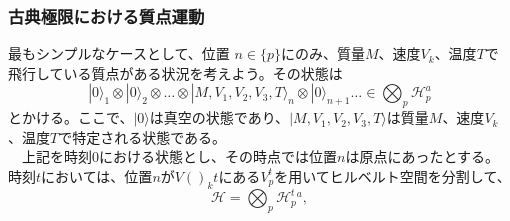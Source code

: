 \subsubsection{古典極限における質点運動}
最もシンプルなケースとして、位置 $n \in \{p\}$にのみ、質量$M$、速度$V_k$、温度$T$で飛行している質点がある状況を考えよう。その状態は
\begin{equation}
    |0\rangle_1 \otimes |0\rangle_2 \otimes \ldots \otimes |M,V_1,V_2,V_3,T\rangle_n \otimes |0\rangle_{n+1} \ldots \in \bigotimes_p \mathcal{H}_p^a
\end{equation}
とかける。ここで、$|0\rangle$は真空の状態であり、$|M,V_1,V_2,V_3,T\rangle$は質量$M$、速度$V_k$、温度$T$で特定される状態である。\\
　上記を時刻$0$における状態とし、その時点では位置$n$は原点にあったとする。時刻$t$においては、位置$n$が$V()_kt$にある$V^t_p$を用いてヒルベルト空間を分割して、
\begin{equation}
    \mathcal{H} = \bigotimes_p \mathcal{H}^t_p^a,
\end{equation}